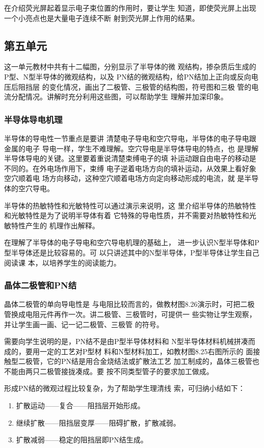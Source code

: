 在介绍荧光屏起着显示电子束位置的作用时，要让学生
知道，即使荧光屏上出现一个小亮点也是大量电子连续不断
射到荧光屏上作用的结果。


\subsection{第五单元}
这一单元教材中共有十二幅图，分别显示了半导体的微
观结构，掺杂质后生成的P型、N型半导体的微观结构，以及
PN结的微观结构，给PN结加上正向或反向电压后阻挡层
的变化情况，画出了二极管、三极管的结构图，符号图和三极
管的电流分配情况。讲解时充分利用这些图，可以帮助学生
理解并加深印象。

\subsubsection{半导体导电机理}

半导体的导电性一节重点是要讲
清楚电子导电和空穴导电，半导体的电子导电跟金属的电子
导电一样，学生不难理解。空穴导电是半导体导电的特点，也
是理解半导体导电的关键。这里要着重说清楚束缚电子的填
补运动跟自由电子的移动是不同的。在外电场作用下，束缚
电子逆着电场方向的填补运动，从效果上看好象空穴顺着电
场方向移动，这种空穴顺着电场方向定向移动形成的电流，就
是半导体的空穴导电。

半导体的热敏特性和光敏特性可以通过演示来说明，这
里介绍半导体的热敏特性和光敏特性是为了说明半导体有着
它特殊的导电性质，并不需要对热敏特性和光敏特性产生的
机理作出解释。

在理解了半导体的电子导电和空穴导电机理的基础上，
进一步认识N型半导体和P型半导体还是比较容易的。可
以只讲述其中的N型半导体，P型半导体让学生自己阅读课
本，以培养学生的阅读能力。

\subsubsection{晶体二极管和PN结} 

晶体二极管的单向导电性是
与电阻比较而言的，做教材图8.26演示时，可把二极
管换成电阻元件再作一次。讲二极管、三极管时，可提供一
些实物让学生观察，并让学生画一画、记一记二极管、三极管
的符号。

需要向学生说明的是，PN结不是由P型半导体材料和
N型半导体材料机械拼凑而成的，要用一定的工艺对P型材
料和N型材料加工，如教材图8.25右图所示的
面接触型二极管，它的PN结是用合金烧结法或扩散法工艺
加工制成的，晶体三极管也不能由两只二极管接拢凑成。要
按不同类型管子的要求加工做成。

形成PN结的微观过程比较复杂，为了帮助学生理清线
索，可归纳小结如下：
\begin{enumerate}
\item 扩散运动——复合——阻挡层开始形成。
\item 继续扩散——阻挡层变厚——阻碍扩散，扩散减弱。
\item 扩散减弱——稳定的阻挡层即PN结生成。
\end{enumerate}

